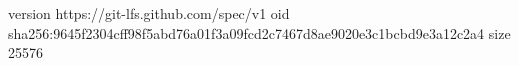 version https://git-lfs.github.com/spec/v1
oid sha256:9645f2304cff98f5abd76a01f3a09fcd2c7467d8ae9020e3c1bcbd9e3a12c2a4
size 25576
